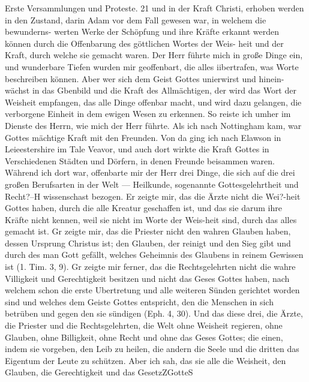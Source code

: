 Erste Versammlungen und Proteste. 21
und in der Kraft Christi, erhoben werden in den Zustand, darin
Adam vor dem Fall gewesen war, in welchem die bewunderns-
werten Werke der Schöpfung und ihre Kräfte erkannt werden
können durch die Offenbarung des göttlichen Wortes der Weis-
heit und der Kraft, durch welche sie gemacht waren. Der Herr
führte mich in große Dinge ein, und wunderbare Tiefen wurden
mir geoffenbart, die alles iibertrafen, was Worte beschreiben
können. Aber wer sich dem Geist Gottes unierwirst und hinein-
wächst in das Gbenbild und die Kraft des Allmächtigen, der wird
das Wort der Weisheit empfangen, das alle Dinge offenbar macht,
und wird dazu gelangen, die verborgene Einheit in dem ewigen
Wesen zu erkennen.
So reiste ich umher im Dienste des Herrn, wie mich der
Herr führte. Als ich nach Nottingham kam, war Gottes mächtige
Kraft mit den Freunden. Von da ging ich nach Elawson in
Leieestershire im Tale Veavor, und auch dort wirkte die Kraft
Gottes in Verschiedenen Städten und Dörfern, in denen Freunde
beisammen waren. Während ich dort war, offenbarte mir der
Herr drei Dinge, die sich auf die drei großen Berufsarten in der
Welt — Heilkunde, sogenannte Gottesgelehrtheit und Recht?--H
wissenschast bezogen. Er zeigte mir, das die Ärzte nicht die
Wei?-heit Gottes haben, durch die alle Kreatur geschaffen ist, und
das sie darum ihre Kräfte nicht kennen, weil sie nicht im Worte der
Weis-heit sind, durch das alles gemacht ist. Gr zeigte mir, das
die Priester nicht den wahren Glauben haben, dessen Ursprung
Christus ist; den Glauben, der reinigt und den Sieg gibt und
durch des man Gott gefällt, welches Geheimnis des Glaubens
in reinem Gewissen ist (1. Tim. 3, 9). Gr zeigte mir ferner, das
die Rechtsgelehrten nicht die wahre Villigkeit und Gerechtigkeit
besitzen und nicht das Geses Gottes haben, nach welchem schon
die erste Ubertretung und alle weiteren Sünden gerichtet worden
sind und welches dem Geiste Gottes entspricht, den die Menschen
in sich betrüben und gegen den sie sündigen (Eph. 4, 30).
Und das diese drei, die Ärzte, die Priester und die Rechtsgelehrten,
die Welt ohne Weisheit regieren, ohne Glauben, ohne Billigkeit,
ohne Recht und ohne das Geses Gottes; die einen, indem sie
vorgeben, den Leib zu heilen, die andern die Seele und die dritten
das Eigentum der Leute zu schützen. Aber ich sah, das sie alle
die Weisheit, den Glauben, die Gerechtigkeit und das GesetzZGotteS


